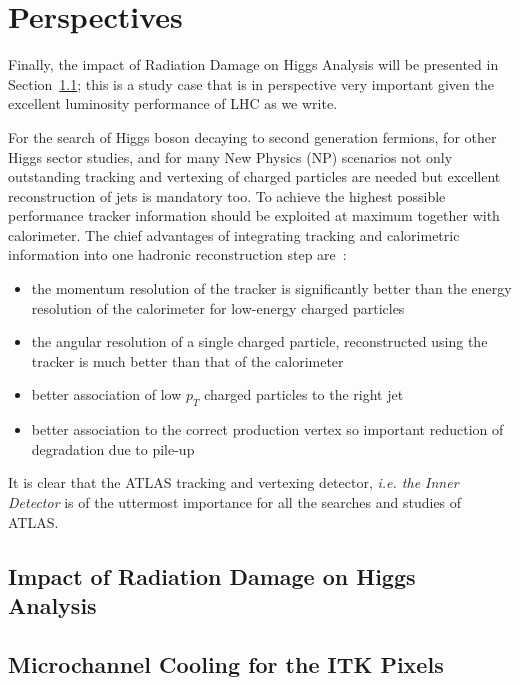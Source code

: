 \chapter{Perspectives}

Finally, the impact of Radiation Damage on Higgs Analysis 
will be presented in Section~\ref{sec:raddamHiggs}; this is a study case that is in 
perspective very important given the excellent luminosity performance of LHC as we write.


For the search of Higgs boson decaying to second generation fermions, for other Higgs sector 
studies, and for many New Physics (NP) scenarios not only outstanding tracking and vertexing of charged particles are needed but  excellent reconstruction of jets is mandatory  too. 
To achieve the highest possible performance tracker information should be exploited at maximum 
together with calorimeter. 
The chief advantages of integrating tracking and calorimetric information into one hadronic reconstruction
step are~\cite{ATLASParticleFlow}:

\begin{itemize}
\item the momentum resolution of the tracker is significantly better than the energy resolution of the
calorimeter for low-energy charged particles
\item the angular resolution of a single charged particle, reconstructed using the tracker is much better
than that of the calorimeter
\item better association of low $p_T$ charged particles to the right jet
\item better association to the correct production vertex so important reduction of degradation due to pile-up  
\end{itemize}

It is clear that the ATLAS tracking and vertexing detector, {\it i.e. the Inner Detector} is of the uttermost importance for all
the searches and studies of ATLAS.

\section{Impact of Radiation Damage on Higgs Analysis}
\label{sec:raddamHiggs}

\section{Microchannel Cooling for the ITK Pixels}
